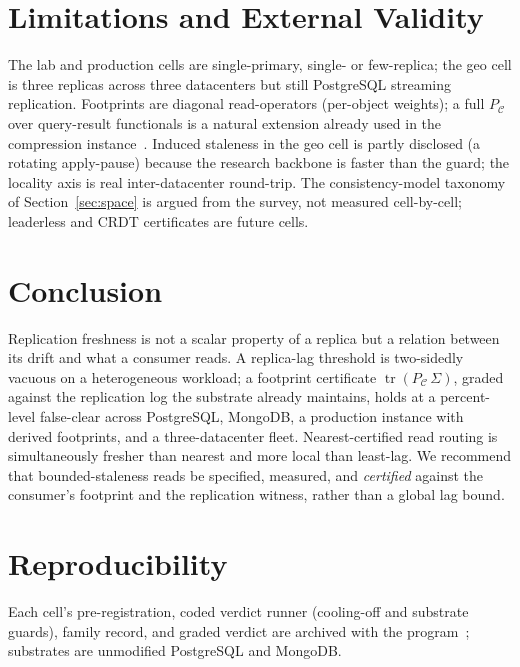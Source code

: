 \documentclass[lettersize,onecolumn]{IEEEtran}
\theoremstyle{remark}
\newcommand{\tr}{\operatorname{tr}}
\newcommand{\PC}{P_{\mathcal{C}}}
\begin{document}
\section{Limitations and External Validity}
The lab and production cells are single-primary, single- or few-replica; the geo
cell is three replicas across three datacenters but still PostgreSQL streaming
replication. Footprints are diagonal read-operators (per-object weights); a full
$\PC$ over query-result functionals is a natural extension already used in the
compression instance~\cite{bond_turboquant}. Induced staleness in the geo cell is
partly disclosed (a rotating apply-pause) because the research backbone is faster
than the guard; the locality axis is real inter-datacenter round-trip. The
consistency-model taxonomy of Section~\ref{sec:space} is argued from the survey,
not measured cell-by-cell; leaderless and CRDT certificates are future cells.

\section{Conclusion}
Replication freshness is not a scalar property of a replica but a relation between
its drift and what a consumer reads. A replica-lag threshold is two-sidedly
vacuous on a heterogeneous workload; a footprint certificate $\tr(\PC\,\Sigma)$,
graded against the replication log the substrate already maintains, holds at a
percent-level false-clear across PostgreSQL, MongoDB, a production instance with
derived footprints, and a three-datacenter fleet. Nearest-certified read routing
is simultaneously fresher than nearest and more local than least-lag. We
recommend that bounded-staleness reads be specified, measured, and
\emph{certified} against the consumer's footprint and the replication witness,
rather than a global lag bound.

\section*{Reproducibility}
Each cell's pre-registration, coded verdict runner (cooling-off and
substrate guards), family record, and graded verdict are archived with the
program~\cite{bond_prereg}; substrates are unmodified PostgreSQL and MongoDB.



\end{document}
